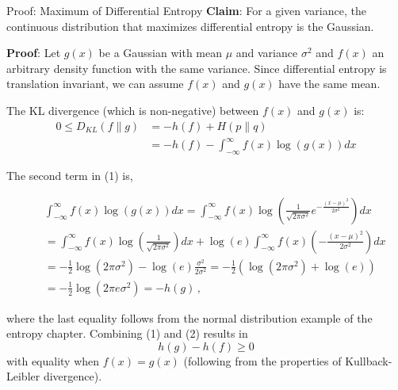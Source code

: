 \documentclass[11pt,compress,t,notes=noshow, xcolor=table]{beamer}
\begin{document}
\begin{vbframe}{Proof: Maximum of Differential Entropy}
  \textbf{Claim}: For a given variance, the continuous distribution that maximizes differential entropy is the Gaussian.

  \lz

  \textbf{Proof}: Let $g(x)$ be a Gaussian with mean $\mu$ and variance $\sigma^2$ and $f(x)$ an arbitrary density function with the same variance. Since differential entropy is translation invariant, we can assume $f(x)$ and $g(x)$ have the same mean.

  \lz
  
  The KL divergence (which is non-negative) between $f(x)$ and $g(x)$ is:
  \begin{equation}
    \begin{aligned}
       0 \leq D_{KL}(f \| g) & = -h(f) + H(p \| q) \\
                             & =-h(f)-\int_{-\infty}^{\infty} f(x) \log (g(x)) dx
    \end{aligned}
  \end{equation}
  
  \framebreak
  
The second term in (1) is, 
  
\begin{footnotesize}
\begin{eqnarray}
& & \int_{-\infty}^{\infty} f(x) \log (g(x)) d x =\int_{-\infty}^{\infty} f(x) \log \left(\frac{1}{\sqrt{2 \pi \sigma^{2}}} e^{-\frac{(x-\mu)^{2}}{2 \sigma^{2}}}\right) d x \nonumber\\ 
& &=\int_{-\infty}^{\infty} f(x) \log \left(\frac{1}{\sqrt{2 \pi \sigma^{2}}}\right) d x+\log (e) \int_{-\infty}^{\infty} f(x)\left(-\frac{(x-\mu)^{2}}{2 \sigma^{2}}\right) d x \nonumber\\ 
& &= -\frac{1}{2} \log \left(2 \pi \sigma^{2}\right)-\log (e) \frac{\sigma^{2}}{2 \sigma^{2}} = -\frac{1}{2} (\log \left(2 \pi \sigma^{2}\right)+\log (e) ) \nonumber\\ 
& &=-\frac{1}{2} \log \left(2 \pi e \sigma^{2}\right) = -h(g) \,,
\end{eqnarray}
\end{footnotesize}

where the last equality follows from the normal distribution example of the entropy chapter. Combining (1) and (2) results in
$$h(g) - h(f) \geq 0$$
with equality when $f(x) = g(x)$ (following from the properties of Kullback-Leibler divergence).
\end{vbframe}
\end{document}
